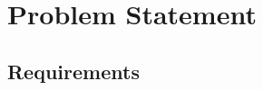 \documentclass[12pt,english, openany]{article}
\begin{document}
\begin{titlepage}
		
	
	
	\pagebreak

\end{titlepage}

{\hypersetup{linkcolor=black}
	\tableofcontents{}
}

\mainmatter



\chapter{Problem Statement}\label{chapt:problem}

\lipsum[1-2]

\section{Requirements} 
\end{document}
